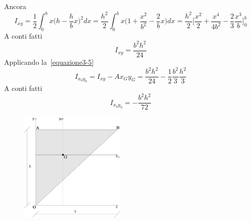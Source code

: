 Ancora
\begin{equation*}
I_{xy} = \frac{1}{2}\int_{0}^{b}x\biggl(h-\frac{h}{b}x\biggr)^{2}dx = \frac{h^{2}}{2}\int_{0}^{b}x\biggl(1+\frac{x^{2}}{b^{2}}-\frac{2}{b}x\biggr)dx = \frac{h^{2}}{2}\Biggl[\frac{x^{2}}{2}+\frac{x^4}{4b^{2}}-\frac{2}{3}\frac{x^{3}}{b}\Biggr]_{0}^{b}
\end{equation*}
A conti fatti
\begin{equation} \label{equazione3-6}
I_{xy} = \frac{b^{2}h^{2}}{24} \tag{3.6}
\end{equation}
Applicando la~\eqref{equazione3-5}
\begin{equation*}
I_{x_{0}y_{0}} = I_{xy} - Ax_{G}y_{G} = \frac{b^{2}h^{2}}{24}-\frac{1}{2}\frac{b^2}{3}\frac{h^2}{3}
\end{equation*}
A conti fatti
\begin{equation} \label{equazione3-7}
\boxed{I_{x_{0}y_{0}}=-\frac{b^{2}h^{2}}{72}} \tag{3.7}
\end{equation}
\renewcommand{\thefigure}{3~-~7}
\begin{figure}[ht]
\centering
\includegraphics[width=0.45\textwidth]{Immagini/Parte_3/Figura3_7/Figura3_7.pdf}
\caption{}
\label{figura3-7}
\end{figure}
